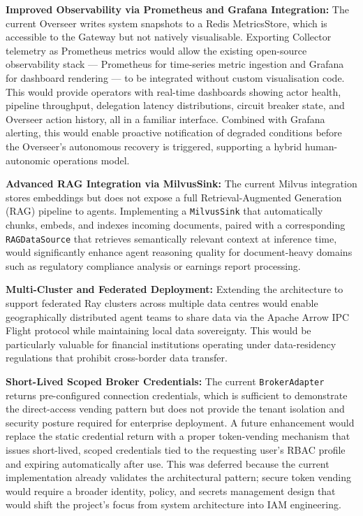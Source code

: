 \documentclass[12pt, a4paper]{report}
\begin{document}
\textbf{Improved Observability via Prometheus and Grafana Integration:}
The current Overseer writes system snapshots to a Redis MetricsStore, which is
accessible to the Gateway but not natively visualisable.
Exporting Collector telemetry as Prometheus metrics would allow the existing
open-source observability stack — Prometheus for time-series metric ingestion and
Grafana for dashboard rendering — to be integrated without custom visualisation code.
This would provide operators with real-time dashboards showing actor health, pipeline
throughput, delegation latency distributions, circuit breaker state, and Overseer
action history, all in a familiar interface.
Combined with Grafana alerting, this would enable proactive notification of degraded
conditions before the Overseer's autonomous recovery is triggered, supporting a
hybrid human-autonomic operations model.

\textbf{Advanced RAG Integration via MilvusSink:}
The current Milvus integration stores embeddings but does not expose a full
Retrieval-Augmented Generation (RAG) pipeline to agents.
Implementing a \texttt{MilvusSink} that automatically chunks, embeds, and indexes
incoming documents, paired with a corresponding \texttt{RAGDataSource} that retrieves
semantically relevant context at inference time, would significantly enhance agent
reasoning quality for document-heavy domains such as regulatory compliance analysis or
earnings report processing.

\textbf{Multi-Cluster and Federated Deployment:}
Extending the architecture to support federated Ray clusters across multiple data
centres would enable geographically distributed agent teams to share data via the
Apache Arrow IPC Flight protocol while maintaining local data sovereignty.
This would be particularly valuable for financial institutions operating under
data-residency regulations that prohibit cross-border data transfer.

\textbf{Short-Lived Scoped Broker Credentials:}
The current \texttt{BrokerAdapter} returns pre-configured connection credentials,
which is sufficient to demonstrate the direct-access vending pattern but does not
provide the tenant isolation and security posture required for enterprise deployment.
A future enhancement would replace the static credential return with a proper
token-vending mechanism that issues short-lived, scoped credentials tied to the
requesting user's RBAC profile and expiring automatically after use.
This was deferred because the current implementation already validates the
architectural pattern; secure token vending would require a broader identity, policy,
and secrets management design that would shift the project's focus from system
architecture into IAM engineering.
\end{document}
